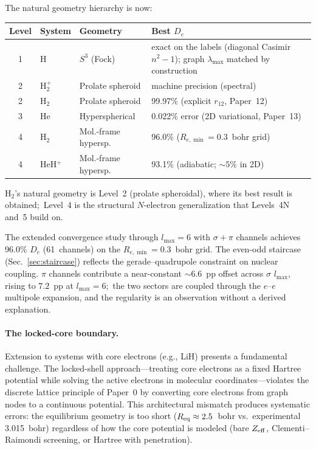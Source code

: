 \documentclass[aps,pra,twocolumn,superscriptaddress,longbibliography]{revtex4-2}
\begin{document}
The natural geometry hierarchy is now:
\begin{center}
\begin{tabular}{clll}
\toprule
Level & System & Geometry & Best $D_e$ \\
\midrule
1 & H       & $S^3$ (Fock)        & exact on the labels (diagonal Casimir $n^2-1$); graph $\lambda_{\max}$ matched by construction \\
2 & H$_2^+$ & Prolate spheroid    & machine precision (spectral) \\
2 & H$_2$   & Prolate spheroid    & 99.97\% (explicit $r_{12}$, Paper~12) \\
3 & He      & Hyperspherical      & 0.022\% error (2D variational, Paper~13) \\
4 & H$_2$   & Mol.-frame hypersp. & 96.0\% ($R_{e,\min} = 0.3$~bohr grid) \\
4 & HeH$^+$ & Mol.-frame hypersp. & 93.1\% (adiabatic; ${\sim}5\%$ in 2D) \\
\bottomrule
\end{tabular}
\end{center}
H$_2$'s natural geometry is Level~2 (prolate spheroidal), where its
best result is obtained;\ Level~4 is the structural $N$-electron
generalization that Levels~4N and~5 build on.

The extended convergence study through $l_{\max} = 6$ with
$\sigma{+}\pi$ channels achieves 96.0\%
$D_e$ (61~channels) on the $R_{e,\min} = 0.3$~bohr grid.
The even-odd staircase (Sec.~\ref{sec:staircase}) reflects the
gerade--quadrupole constraint on nuclear coupling.
$\pi$ channels contribute a near-constant ${\sim}6.6$~pp offset
across $\sigma$ $l_{\max}$, rising to $7.2$~pp at $l_{\max} = 6$;\
the two sectors are coupled through the $e$--$e$ multipole expansion,
and the regularity is an observation without a derived explanation.

\paragraph{The locked-core boundary.}
Extension to systems with core electrons (e.g., LiH) presents a
fundamental challenge.  The locked-shell approach---treating core
electrons as a fixed Hartree potential while solving the active electrons
in molecular coordinates---violates the discrete lattice principle of
Paper~0 by converting core electrons from graph nodes to a continuous
potential.  This architectural mismatch produces systematic errors: the
equilibrium geometry is too short ($R_{\rm eq} \approx 2.5$~bohr vs.\
experimental 3.015~bohr) regardless of how the core potential is modeled
(bare $Z_{\rm eff}$, Clementi--Raimondi screening, or Hartree with
penetration).
\end{document}
